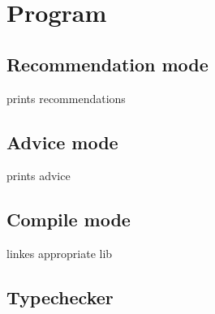 \documentclass[11pt]{article}
\begin{document}
	   \section{Program}
	   \subsection{Recommendation mode}
	   prints recommendations 
	   \subsection{Advice mode}
	   prints advice
	   \subsection{Compile mode}
	   linkes appropriate lib
	   \subsection{Typechecker}

	   
\end{document}
